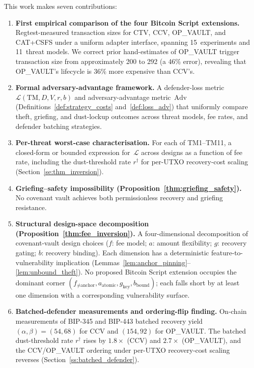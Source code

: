 This work makes seven contributions:

\begin{enumerate}
\item \textbf{First empirical comparison of the four Bitcoin Script extensions.}
  Regtest-measured transaction sizes for CTV, CCV, OP\_VAULT, and CAT+CSFS under a
  uniform adapter interface, spanning 15~experiments and 11~threat models. We correct
  prior hand-estimates of OP\_VAULT trigger transaction size from approximately
  200\vB{} to 292\vB{} (a 46\% error), revealing that OP\_VAULT's lifecycle is 36\% more
  expensive than CCV's.

\item \textbf{Formal adversary-advantage framework.}
  A defender-loss metric~$\mathcal{L}(\mathrm{TM}, D, V, r, b)$ and adversary-advantage
  metric~$\mathrm{Adv}$ (Definitions~\ref{def:strategy_costs}
  and~\ref{def:loss_adv}) that uniformly compare theft, griefing, and dust-lockup
  outcomes across threat models, fee rates, and defender batching strategies.

\item \textbf{Per-threat worst-case characterisation.}
  For each of TM1--TM11, a closed-form or bounded expression for~$\mathcal{L}$
  across designs as a function of fee rate, including the dust-threshold rate
  $r^\dagger$ for per-UTXO recovery-cost scaling (Section~\ref{se:thm_inversion}).

\item \textbf{Griefing--safety impossibility (Proposition~\ref{thm:griefing_safety}).}
  No covenant vault achieves both permissionless recovery and griefing resistance.

\item \textbf{Structural design-space decomposition
  (Proposition~\ref{thm:fee_inversion}).}
  A four-dimensional decomposition of covenant-vault design choices
  ($f$: fee model; $a$: amount flexibility; $g$: recovery gating;
  $b$: recovery binding). Each dimension has a deterministic
  feature-to-vulnerability implication
  (Lemmas~\ref{lem:anchor_pinning}--\ref{lem:unbound_theft}). No
  proposed Bitcoin Script extension occupies the dominant corner
  $(f_{\neq\text{anchor}}, a_{\text{atomic}}, g_{\text{key}},
  b_{\text{bound}})$; each falls short by at least one dimension with
  a corresponding vulnerability surface.

\item \textbf{Batched-defender measurements and ordering-flip finding.}
  On-chain measurements of BIP-345 and BIP-443 batched recovery yield
  $(\alpha, \beta) = (54, 68)$\vB{} for CCV and $(154, 92)$\vB{} for OP\_VAULT. The
  batched dust-threshold rate $r^\dagger$ rises by $1.8\times$ (CCV) and $2.7\times$
  (OP\_VAULT), and the CCV/OP\_VAULT ordering under per-UTXO recovery-cost scaling reverses
  (Section~\ref{ss:batched_defender}).


\end{enumerate}
